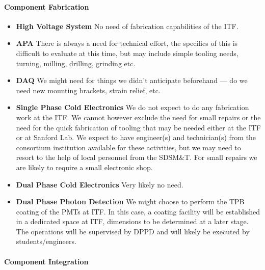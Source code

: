 \paragraph{\bf Component Fabrication} 

\begin{itemize}
  \item {\bf High Voltage System} No need of fabrication capabilities of the ITF.
  \item {\bf APA} There is always a need for technical effort, the specifics of this is difficult to 
evaluate at this time, but may include simple tooling needs, turning, milling, drilling, grinding etc.
  \item {\bf DAQ} We might need for things we didn't anticipate beforehand --- do we need new mounting brackets, strain relief, etc.
  \item {\bf Single Phase Cold Electronics} We do not expect to do any fabrication work at 
the ITF. We cannot however exclude the need for small repairs or the need for the quick fabrication 
of tooling that may be needed either at the ITF or at Sanford Lab. We expect to have engineer(s) and 
technician(s) from the consortium institution available for these activities, but we may need to 
resort to the help of local personnel from the SDSM\&T. For small repairs we are likely to require a 
small electronic shop.
  \item {\bf Dual Phase Cold Electronics} Very likely no need.
  \item {\bf Dual Phase Photon Detection} We might choose to perform the TPB coating of the 
PMTs at ITF. In this case, a coating facility will be established in a dedicated space at ITF, 
dimensions to be determined at a later stage. The operations will be supervised by DPPD and will 
likely be executed by students/engineers. 
\end{itemize}

\paragraph{\bf Component Integration}

